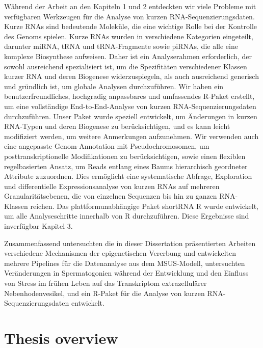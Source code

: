 \documentclass[12pt,twoside]{reedthesis}
\begin{document}
Während der Arbeit an den Kapiteln 1 und 2 entdeckten wir viele Probleme mit verfügbaren Werkzeugen für die Analyse von kurzen RNA-Sequenzierungsdaten. Kurze RNAs sind bedeutende Moleküle, die eine wichtige Rolle bei der Kontrolle des Genoms spielen. Kurze RNAs wurden in verschiedene Kategorien eingeteilt, darunter miRNA, tRNA und tRNA-Fragmente sowie piRNAs, die alle eine komplexe Biosynthese aufweisen. Daher ist ein Analyserahmen erforderlich, der sowohl ausreichend spezialisiert ist, um die Spezifitäten verschiedener Klassen kurzer RNA und deren Biogenese widerzuspiegeln, als auch ausreichend generisch und gründlich ist, um globale Analysen durchzuführen. Wir haben ein benutzerfreundliches, hochgradig anpassbares und umfassendes R-Paket erstellt, um eine vollständige End-to-End-Analyse von kurzen RNA-Sequenzierungsdaten durchzuführen. Unser Paket wurde speziell entwickelt, um Änderungen in kurzen RNA-Typen und deren Biogenese zu berücksichtigen, und es kann leicht modifiziert werden, um weitere Anmerkungen aufzunehmen. Wir verwenden auch eine angepasste Genom-Annotation mit Pseudochromosomen, um posttranskriptionelle Modifikationen zu berücksichtigen, sowie einen flexiblen regelbasierten Ansatz, um Reads entlang eines Baums hierarchisch geordneter Attribute zuzuordnen. Dies ermöglicht eine systematische Abfrage, Exploration und differentielle Expressionsanalyse von kurzen RNAs auf mehreren Granularitätsebenen, die von einzelnen Sequenzen bis hin zu ganzen RNA-Klassen reichen. Das plattformunabhängige Paket shortRNA R wurde entwickelt, um alle Analyseschritte innerhalb von R durchzuführen. Diese Ergebnisse sind inverfügbar Kapitel 3.

Zusammenfassend untersuchten die in dieser Dissertation präsentierten Arbeiten verschiedene Mechanismen der epigenetischen Vererbung und entwickelten mehrere Pipelines für die Datenanalyse aus dem MSUS-Modell, untersuchten Veränderungen in Spermatogonien während der Entwicklung und den Einfluss von Stress im frühen Leben auf das Transkriptom extrazellulärer Nebenhodenvesikel, und ein R-Paket für die Analyse von kurzen RNA-Sequenzierungsdaten entwickelt.

\hypertarget{overview}{%
\chapter*{Thesis overview}\label{overview}}
\end{document}
